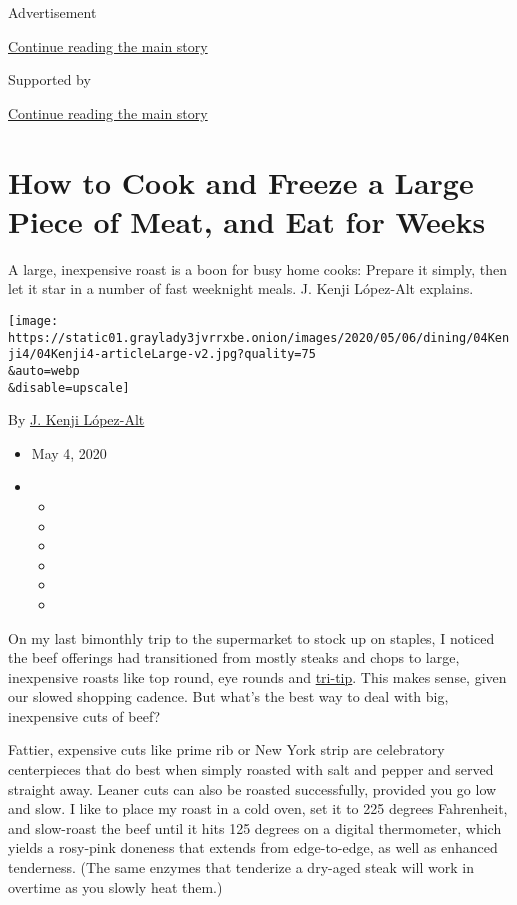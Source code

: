 Advertisement

\protect\hyperlink{after-top}{Continue reading the main story}

Supported by

\protect\hyperlink{after-sponsor}{Continue reading the main story}

\hypertarget{how-to-cook-and-freeze-a-large-piece-of-meat-and-eat-for-weeks}{%
\section{How to Cook and Freeze a Large Piece of Meat, and Eat for
Weeks}\label{how-to-cook-and-freeze-a-large-piece-of-meat-and-eat-for-weeks}}

A large, inexpensive roast is a boon for busy home cooks: Prepare it
simply, then let it star in a number of fast weeknight meals. J. Kenji
López-Alt explains.

\texttt{[image: https://static01.graylady3jvrrxbe.onion/images/2020/05/06/dining/04Kenji4/04Kenji4-articleLarge-v2.jpg?quality=75\\\&auto=webp\\\&disable=upscale]}

By \href{https://www.nytimes3xbfgragh.onion/by/j-kenji-lopez-alt}{J.
Kenji López-Alt}

\begin{itemize}
\item
  May 4, 2020
\item
  \begin{itemize}
  \item
  \item
  \item
  \item
  \item
  \item
  \end{itemize}
\end{itemize}

On my last bimonthly trip to the supermarket to stock up on staples, I
noticed the beef offerings had transitioned from mostly steaks and chops
to large, inexpensive roasts like top round, eye rounds and
\href{https://www.nytimes3xbfgragh.onion/2014/10/29/dining/santa-maria-tri-tip-recipe.html}{tri-tip}.
This makes sense, given our slowed shopping cadence. But what's the best
way to deal with big, inexpensive cuts of beef?

Fattier, expensive cuts like prime rib or New York strip are celebratory
centerpieces that do best when simply roasted with salt and pepper and
served straight away. Leaner cuts can also be roasted successfully,
provided you go low and slow. I like to place my roast in a cold oven,
set it to 225 degrees Fahrenheit, and slow-roast the beef until it hits
125 degrees on a digital thermometer, which yields a rosy-pink doneness
that extends from edge-to-edge, as well as enhanced tenderness. (The
same enzymes that tenderize a dry-aged steak will work in overtime as
you slowly heat them.)

